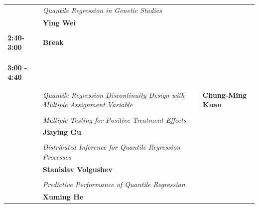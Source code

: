 \documentclass[11pt]{amsart}
\begin{document}
\begin{tabularx}{\linewidth}{l X}
& \it{Quantile Regression in Genetic Studies } \\
& \small{\textbf{Ying Wei}} \\

\\
\bf{2:40-3:00 } & \large{\bf{Break}} \\
\\
\\
\\
\bf{3:00 - 4:40} & \large{}  \\
\hline
\\
\\
& \it{Quantile Regression Discontinuity Design with Multiple Assignment Variable}
& \small{\textbf{Chung-Ming Kuan}} \\
\\
& \it{Multiple Testing for Positive Treatment Effects} \\
& \small{\textbf{Jiaying Gu}} \\
\\
& \it{Distributed Inference for Quantile Regression Processes} \\
& \small{\textbf{Stanislav Volgushev}} \\
\\
& \it{Predictive Performance of Quantile Regression} \\
& \small{\textbf{Xuming He}} \\

\end{tabularx}
\end{document}
